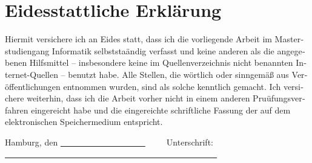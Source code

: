 \chapter*{Eidesstattliche Erklärung}

\begin{otherlanguage}{ngerman}
Hiermit versichere ich an Eides statt, dass ich die vorliegende Arbeit im
Masterstudiengang Informatik selbststaändig verfasst und keine anderen als die angegebenen Hilfsmittel – insbesondere keine im Quellenverzeichnis nicht 
benannten Internet-Quellen – benutzt habe. Alle Stellen, die 
wörtlich oder sinngemäß aus Veröffentlichungen entnommen wurden, sind als
solche kenntlich gemacht. Ich versichere weiterhin, dass ich die Arbeit vorher
nicht in einem anderen Pruüfungsverfahren eingereicht habe und die eingereichte
schriftliche Fassung der auf dem elektronischen Speichermedium entspricht. \\

\end{otherlanguage}
\vspace{2cm} 

\noindent Hamburg, den \uline{~~~~~~~~~~~~~~~~~~~~}~~~~~Unterschrift: \uline{~~~~~~~~~~~~~~~~~~~~~~~~~~~~~~~~~~~~~~~~~~~~~~~~~~} 


